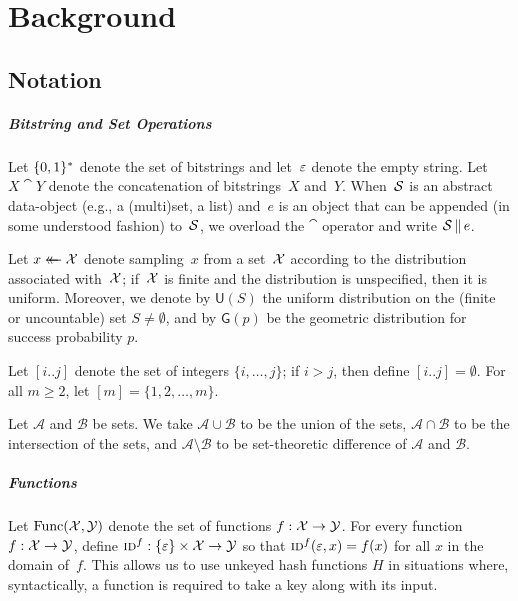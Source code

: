 \chapter{Background}\label{chap:background}

\section{Notation}

\paragraph{Bitstring and Set Operations}

Let $\{0,1\}^*$ denote the set of bitstrings and let~$\varepsilon$ denote the empty
string. Let $X \cat Y$ denote the concatenation of bitstrings~$X$ and~$Y$.  When~$\mathcal{S}$ is an abstract data-object (e.g., a (multi)set, a list) and~$e$ is an object that can be appended (in some understood fashion) to~$\mathcal{S}$, we overload the $\cat$ operator and write $\mathcal{S} \, \| \, e$.

Let $x \mathrel{\leftarrow\mkern-14mu\leftarrow} \mathcal{X}$ denote sampling~$x$ from a set~$\mathcal{X}$ according to the distribution associated with~$\mathcal{X}$; if~$\mathcal{X}$ is finite and the distribution is unspecified, then it is uniform. Moreover, we denote by $\mathsf{U}(S)$ the uniform distribution on the (finite or uncountable) set $S\neq\emptyset$, and by $\mathsf{G}(p)$ be the geometric distribution for success probability $p$.

Let $[i..j]$ denote the set of integers $\{i, \ldots, j\}$; if $i > j$, then define $[i..j] = \emptyset$. For all $m \geq 2$, let $[m] = \{1,2,\ldots,m\}$.

Let $\mathcal{A}$ and $\mathcal{B}$ be sets. We take $\mathcal{A} \cup \mathcal{B}$ to be the union of the sets, $\mathcal{A} \cap \mathcal{B}$ to be the intersection of the sets, and $\mathcal{A} \setminus \mathcal{B}$ to be set-theoretic difference of $\mathcal{A}$ and $\mathcal{B}$.

\paragraph{Functions}

Let $\mathrm{Func}(\mathcal{X},\mathcal{Y})$ denote the set of functions $f:\mathcal{X}\to\mathcal{Y}$. For every function~$f: \mathcal{X} \to \mathcal{Y}$, define $\textnormal{\textsc{id}}^f: \{\varepsilon\} \times \mathcal{X} \to \mathcal{Y}$ so that $\textnormal{\textsc{id}}^f(\varepsilon, x) = f(x)$ for all $x$ in the domain of~$f$. This allows us to use unkeyed hash functions $H$ in situations where, syntactically, a function is required to take a key along with its input. 


